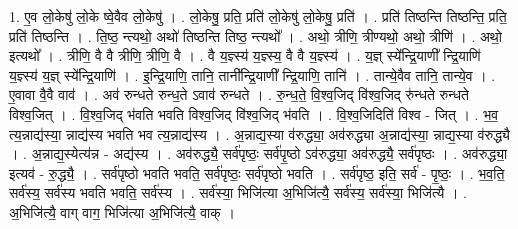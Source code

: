 \documentclass[17pt]{extarticle}
\begin{document}
1. ए॒व लो॒केषु॑ लो॒के ष्वे॒वैव लो॒केषु॑ । . लो॒केषु॒ प्रति॒ प्रति॑ लो॒केषु॑ लो॒केषु॒ प्रति॑ । . प्रति॑ तिष्ठन्ति तिष्ठन्ति॒ प्रति॒ प्रति॑ तिष्ठन्ति । . ति॒ष्ठ॒ न्त्यथो॒ अथो॑ तिष्ठन्ति तिष्ठ॒ न्त्यथो᳚ । . अथो॒ त्रीणि॒ त्रीण्यथो॒ अथो॒ त्रीणि॑ । . अथो॒ इत्यथो᳚ । . त्रीणि॒ वै वै त्रीणि॒ त्रीणि॒ वै । . वै य॒ज्ञ्स्य॑ य॒ज्ञ्स्य॒ वै वै य॒ज्ञ्स्य॑ । . य॒ज्ञ् स्ये᳚न्द्रि॒याणी᳚ न्द्रि॒याणि॑ य॒ज्ञ्स्य॑ य॒ज्ञ् स्ये᳚न्द्रि॒याणि॑ । . इ॒न्द्रि॒याणि॒ तानि॒ तानी᳚न्द्रि॒याणी᳚ न्द्रि॒याणि॒ तानि॑ । . तान्ये॒वैव तानि॒ तान्ये॒व । . ए॒वावा वै॒वै वाव॑ । . अव॑ रुन्धते रुन्ध॒ते ऽवाव॑ रुन्धते । . रु॒न्ध॒ते॒ वि॒श्व॒जिद् वि॑श्व॒जिद् रु॑न्धते रुन्धते विश्व॒जित् । . वि॒श्व॒जिद् भ॑वति भवति विश्व॒जिद् वि॑श्व॒जिद् भ॑वति । . वि॒श्व॒जिदिति॑ विश्व - जित् । . भ॒व॒ त्य॒न्नाद्य॑स्या॒ न्नाद्य॑स्य भवति भव त्य॒न्नाद्य॑स्य । . अ॒न्नाद्य॒स्या व॑रुद्ध्या॒ अव॑रुद्ध्या अ॒न्नाद्य॑स्या॒ न्नाद्य॒स्या व॑रुद्ध्यै । . अ॒न्नाद्य॒स्येत्य॑न्न - अद्य॑स्य । . अव॑रुद्ध्यै॒ सर्व॑पृष्ठः॒ सर्व॑पृ॒ष्ठो ऽव॑रुद्ध्या॒ अव॑रुद्ध्यै॒ सर्व॑पृष्ठः । . अव॑रुद्ध्या॒ इत्यव॑ - रु॒द्ध्यै॒ । . सर्व॑पृष्ठो भवति भवति॒ सर्व॑पृष्ठः॒ सर्व॑पृष्ठो भवति । . सर्व॑पृष्ठ॒ इति॒ सर्व॑ - पृ॒ष्ठः॒ । . भ॒व॒ति॒ सर्व॑स्य॒ सर्व॑स्य भवति भवति॒ सर्व॑स्य । . सर्व॑स्या॒ भिजि॑त्या अ॒भिजि॑त्यै॒ सर्व॑स्य॒ सर्व॑स्या॒ भिजि॑त्यै । . अ॒भिजि॑त्यै॒ वाग् वाग॒ भिजि॑त्या अ॒भिजि॑त्यै॒ वाक् । \newline
\end{document}
